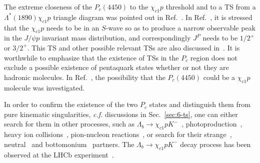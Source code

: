 The extreme closeness of the $P_c(4450)$ to the $\chi_{c1} p$ threshold and to a
TS from a $\Lambda^*(1890)\chi_{c1}p$ triangle diagram was pointed out in
Ref.~\cite{Guo:2015umn}. In Ref.~\cite{Bayar:2016ftu}, it is stressed  that the
$\chi_{c1}p$ needs to be in an $S$-wave so as to produce a narrow observable
peak in the $J/\psi p$ invariant mass distribution, and correspondingly $J^P$
needs to be $1/2^+$ or $3/2^+$. This TS and other possible relevant TSs
are also discussed in~\cite{Liu:2015fea,Guo:2016bkl}. It is worthwhile to
emphasize that the existence of TSs in the $P_c$ region does not exclude a 
possible existence of pentaquark states whether or not they are hadronic
molecules. In Ref.~\cite{Meissner:2015mza}, the possibility that the $P_c(4450)$
could be a $\chi_{c1}p$ molecule was investigated.

In order to confirm the existence of the two $P_c$ states and distinguish them
from pure kinematic singularities, {\sl c.f.} discussions in
Sec.~\ref{sec:6-ts}, one can either search for them in other processes, such as
$\Lambda_b\to\chi_{c1}p K^-$~\cite{Guo:2015umn},
photoproduction~\cite{Karliner:2015voa,Kubarovsky:2015aaa,
Wang:2015jsa,Kubarovsky:2016whd,Gryniuk:2016mpk,Blin:2016dlf,Huang:2016tcr},
heavy ion collisions~\cite{Wang:2016vxa}, pion-nucleon
reactions~\cite{Kim:2016cxr,Liu:2016dli,Lin:2017mtz}, or search for their
strange~\cite{Feijoo:2015kts,Feijoo:2015cca,Ramos:2016odk,Chen:2016heh,
Lu:2016roh}, neutral~\cite{Lebed:2015tna,Lu:2015fva} and
bottomonium~\cite{Xiao:2015fia} partners. The $\Lambda_b\to\chi_{c1}p K^-$ decay
process has been observed at the LHCb experiment~\cite{Aaij:2017awb}.


